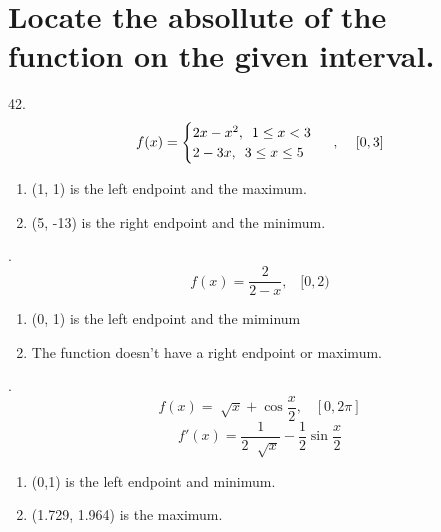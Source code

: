 \documentclass[11pt]{article}
\begin{document}
\section{Locate the absollute of the function on the given interval.}
42.\begin{equation}
    \setcounter{equation}{1}
    f(x)=
\begin{cases}
    2x-x^2,\,\,\, 1\leq  x<3\\
    2-3x,\,\,\, 3\leq x\leq 5
\end{cases}\
,\,\,\,\,\,\,\,[0, 3]
\end{equation}
\begin{enumerate}[]
    \item (1, 1) is the left endpoint and the maximum.
    \item (5, -13) is the right endpoint and the minimum.
\end{enumerate}

\vspace{1cm}
.\[f(x)=\frac{2}{2-x},\,\,\,\,\,[0, 2)\]
\begin{enumerate}[]
    \item (0, 1) is the left endpoint and the miminum
    \item The function doesn't have a right endpoint or maximum. 
\end{enumerate}

\vspace{1cm}
.\[f(x)=\sqrt[]{x}+\cos\frac{x}{2},\,\,\,\,\,[0, 2\pi]\]
\[f'(x)=\frac{1}{2\,\,\sqrt[]{x}}-\frac{1}{2}\sin\frac{x}{2}\]
\begin{enumerate}[]
    \item (0,1) is the left endpoint and minimum.
    \item (1.729, 1.964) is the maximum.
\end{enumerate}
\end{document}
